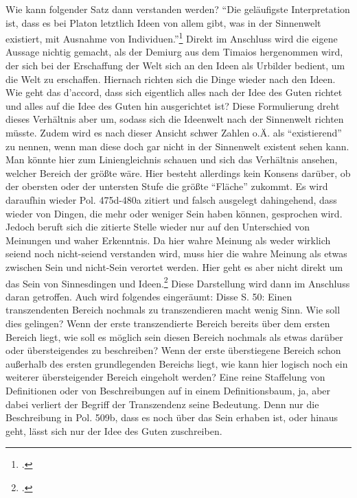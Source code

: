 Wie kann folgender Satz dann verstanden werden? \enquote{Die geläufigste Interpretation ist, dass es bei Platon letztlich Ideen von allem gibt, was in der Sinnenwelt existiert, mit Ausnahme von Individuen.}\footcite[][S. 31]{DisseMetaphysik} Direkt im Anschluss wird die eigene Aussage nichtig gemacht, als der Demiurg aus dem Timaios hergenommen wird, der sich bei der Erschaffung der Welt sich an den Ideen als Urbilder bedient, um die Welt zu erschaffen. Hiernach richten sich die Dinge wieder nach den Ideen. Wie geht das d'accord, dass sich eigentlich alles nach der Idee des Guten richtet und alles auf die Idee des Guten hin ausgerichtet ist? Diese Formulierung dreht dieses Verhältnis aber um, sodass sich die Ideenwelt nach der Sinnenwelt richten müsste. Zudem wird es nach dieser Ansicht schwer Zahlen o.Ä. als \enquote{existierend} zu nennen, wenn man diese doch gar nicht in der Sinnenwelt existent sehen kann. Man könnte hier zum Liniengleichnis schauen und sich das Verhältnis ansehen, welcher Bereich der größte wäre. Hier besteht allerdings kein Konsens darüber, ob der obersten oder der untersten Stufe die größte \enquote{Fläche} zukommt.
Es wird daraufhin wieder Pol. 475d-480a zitiert und falsch ausgelegt dahingehend, dass wieder von Dingen, die mehr oder weniger Sein haben können, gesprochen wird. Jedoch beruft sich die zitierte Stelle wieder nur auf den Unterschied von Meinungen und waher Erkenntnis. Da hier wahre Meinung als weder wirklich seiend noch nicht-seiend verstanden wird, muss hier die wahre Meinung als etwas zwischen Sein und nicht-Sein verortet werden. Hier geht es aber nicht direkt um das Sein von Sinnesdingen und Ideen.\footcite[vgl.][S. 37f.]{DisseMetaphysik} Diese Darstellung wird dann im Anschluss daran getroffen.
Auch wird folgendes eingeräumt: 
Disse S. 50: 
Einen transzendenten Bereich nochmals zu transzendieren macht wenig Sinn. Wie soll dies gelingen? Wenn der erste transzendierte Bereich bereits über dem ersten Bereich liegt, wie soll es möglich sein diesen Bereich nochmals als etwas darüber oder übersteigendes zu beschreiben? Wenn der erste überstiegene Bereich schon außerhalb des ersten grundlegenden Bereichs liegt, wie kann hier logisch noch ein weiterer übersteigender Bereich eingeholt werden? Eine reine Staffelung von Definitionen oder von Beschreibungen auf in einem Definitionsbaum, ja, aber dabei verliert der Begriff der Transzendenz seine Bedeutung. Denn nur die Beschreibung in Pol. 509b, dass es noch über das Sein erhaben ist, oder hinaus geht, lässt sich nur der Idee des Guten zuschreiben. 
